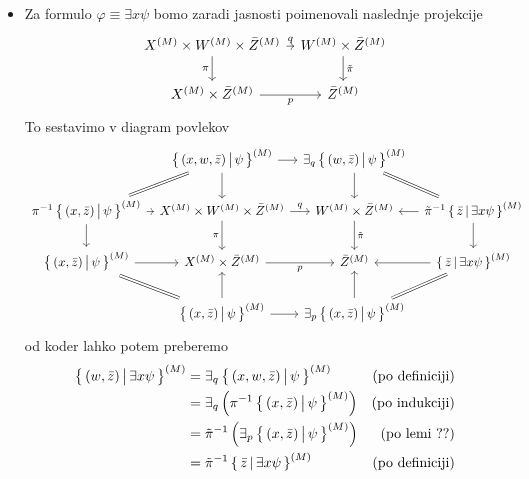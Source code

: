 \documentclass[../kategoricna_logika.tex]{subfiles}
\begin{document}
\begin{dokaz}
\begin{itemize}
      \item 
        Za formulo $\varphi \equiv \exists x \psi$ bomo zaradi jasnosti poimenovali naslednje projekcije
        \begin{equation*}
        \begin{tikzcd}[column sep=tiny]
          \interp{X} \times \interp{W} \times \interp{\bar{Z}} \ar[d, "\pi"'] \ar[r, "q"] & \interp{W} \times \interp{\bar{Z}} \ar[d, "\tilde{\pi}"] \\
          \interp{X} \times \interp{\bar{Z}} \ar[r, "p"'] & \interp{\bar{Z}}
        \end{tikzcd}
        \end{equation*}
        To sestavimo v diagram povlekov
        \begin{equation*}
        \begin{tikzcd}[column sep=tiny]
          & \setb{(x,w,\bar{z})}{\psi}^{(M)} \ar[dl, equal] \ar[d] \ar[r] & \exists_q \setb{(w,\bar{z})}{\psi}^{(M)} \ar[d] \ar[dr, equal] & \\
          \pi^{-1}\setb{(x,\bar{z})}{\psi}^{(M)} \ar[d] \ar[r] & X^{(M)} \times W^{(M)} \times \bar{Z}^{(M)} \ar[d, "\pi"'] \ar[r, "q"] & W^{(M)} \times \bar{Z}^{(M)} \ar[d, "\tilde{\pi}"] & \tilde{\pi}^{-1} \setb{\bar{z}}{\exists x \psi}^{(M)} \ar[l] \ar[d] \\
          \setb{(x,\bar{z})}{\psi}^{(M)} \ar[dr, equal] \ar[r] & X^{(M)} \times \bar{Z}^{(M)} \ar[r, "p"'] & \bar{Z}^{(M)}  & \setb{\bar{z}}{\exists x \psi}^{(M)} \ar[l] \ar[dl, equal] \\
          & \setb{(x,\bar{z})}{\psi}^{(M)} \ar[u] \ar[r] & \exists_p \setb{(x,\bar{z})}{\psi}^{(M)} \ar[u] &
        \end{tikzcd}
        \end{equation*}
        od koder lahko potem preberemo
        \begin{align*}
          \left\lbrace\, (w, \bar{z}) \,\middle|\, \exists x \psi \,\right\rbrace^{(M)} &= \exists_q \left\lbrace\, (x,w,\bar{z}) \,\middle|\, \psi \,\right\rbrace^{(M)} &\text{(po definiciji)} \\
              &= \exists_q \left( \pi^{-1} \left\lbrace\, (x, \bar{z}) \,\middle|\, \psi \,\right\rbrace^{(M)}\right) &\text{(po indukciji)} \\
              &= \tilde{\pi}^{-1} \left( \exists_p \left\lbrace\, (x,\bar{z}) \,\middle|\, \psi \,\right\rbrace^{(M)} \right) &\text{(po lemi ??)} \\
              &= \tilde{\pi}^{-1} \left\lbrace\, \bar{z} \,\middle|\, \exists x \psi \,\right\rbrace^{(M)} &\text{(po definiciji)}
        \end{align*}
  \end{itemize}
\end{dokaz}
\end{document}
